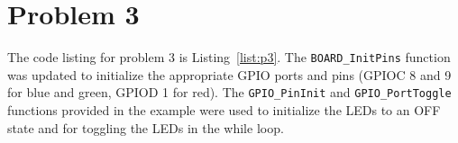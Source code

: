\section*{Problem 3}
The code listing for problem 3 is Listing~\ref{list:p3}. The \texttt{BOARD\_InitPins} function was updated to initialize the appropriate GPIO ports and pins (GPIOC 8 and 9 for blue and green, GPIOD 1 for red). The \texttt{GPIO\_PinInit} and \texttt{GPIO\_PortToggle} functions provided in the example were used to initialize the LEDs to an OFF state and for toggling the LEDs in the while loop.

